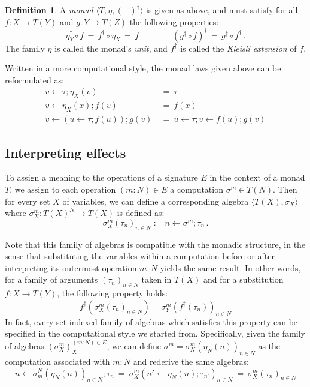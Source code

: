 \documentclass[11pt,oneside,draft]{book}
\theoremstyle{definition}
\newtheorem{definition}[theorem]{Definition}
\begin{document}
\begin{definition} \label{def:setmonad}
A \emph{monad} $\langle T, \eta, (-)^\dagger \rangle$
is given as above,
and must satisfy
for all $f : X \rightarrow T(Y)$ and
$g : Y \rightarrow T(Z)$
the following properties:
\[
  \eta_Y^\dagger \circ f \, = \,
  f^\dagger \circ \eta_X \, = \,
  f
  \qquad \qquad
  (g^\dagger \circ f)^\dagger \, = \,
  g^\dagger \circ f^\dagger
  \,.
\]
The family $\eta$
is called the monad's \emph{unit},
and $f^\dagger$
is called the \emph{Kleisli extension} of $f$.
\end{definition}

Written in a more computational style,
the monad laws given above
can be reformulated as:
\begin{align*}
  v \mathbin\leftarrow \tau \mathbin; \eta_X(v) \:&=\: \tau
  \\
  v \mathbin\leftarrow \eta_X(x) \mathbin; f(v) \:&=\: f(x)
  \\
  v \mathbin\leftarrow
    (u \mathbin\leftarrow \tau \mathbin; f(u))
      \mathbin; g(v) \:&=\:
  u \mathbin\leftarrow \tau \mathbin;
    v \mathbin\leftarrow f(u) \mathbin;
      g(v)
\end{align*}


\subsection{Interpreting effects} %

To assign a meaning to the operations of a signature $E$
in the context of a monad $T$,
we assign
to each operation $(m \mathbin: N) \in E$
a computation $\sigma^m \in T(N)$.
Then for every set $X$ of variables,
we can define a corresponding algebra $\langle T(X), \sigma_X \rangle$
where $\sigma_X^m : T(X)^N \rightarrow T(X)$
is defined as:
\[
  \sigma_X^m(\tau_n)_{n \in N} :=
    n \mathbin\leftarrow \sigma^m \mathbin; \tau_n
  \,.
\]

Note that this family of algebras
is compatible with the monadic structure,
in the sense that substituting the variables
within a computation
before or after interpreting
its outermost operation $m \mathbin: N$
yields the same result.
In other words,
for a family of arguments $(\tau_n)_{n \in N}$ taken in $T(X)$
and for a substitution $f : X \rightarrow T(Y)$,
the following property holds:
\begin{equation} \label{eqn:monadint}
  f^\dagger(\sigma_X^m(\tau_n)_{n \in N}) =
  \sigma_Y^m(f^\dagger(\tau_n))_{n \in N}
\end{equation}
In fact,
every set-indexed family of algebras which satisfies this property
can be specified in the computational
style we started from.
Specifically,
given the family of algebras $(\sigma_X^m)_X^{(m \mathbin: N) \in E}$,
we can define
$\sigma^m = \sigma_N^m(\eta_N(n))_{n \in N}$
as the computation associated with $m \mathbin: N$
and rederive the same algebras:
\[
  n \mathbin\leftarrow \sigma^N_m(\eta_N(n))_{n \in N} \mathbin; \tau_n
  \: = \:
  \sigma^m_X(n' \mathbin\leftarrow \eta_N(n) \mathbin; \tau_{n'})_{n \in N}
  \: = \:
  \sigma^m_X(\tau_n)_{n \in N}
\]
\end{document}
